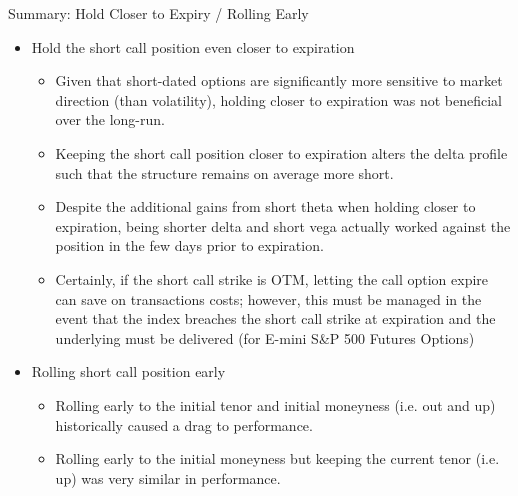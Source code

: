 \documentclass{beamer}
\begin{document}
\begin{frame}{Summary: Hold Closer to Expiry / Rolling Early}
\begin{itemize}
\item Hold the short call position even closer to expiration
\begin{itemize}
\item Given that short-dated options are significantly more sensitive to market direction (than volatility), holding closer to expiration was not beneficial over the long-run.
\item Keeping the short call position closer to expiration alters the delta profile such that the structure remains on average more short. 
\item Despite the additional gains from short theta when holding closer to expiration, being shorter delta and short vega actually worked against the position in the few days prior to expiration. 
\item Certainly, if the short call strike is OTM, letting the call option expire can save on transactions costs; however, this must be managed in the event that the index breaches the short call strike at expiration and the underlying must be delivered (for E-mini S\&P 500 Futures Options)
\end{itemize}
\item Rolling short call position early
\begin{itemize}
\item Rolling early to the initial tenor and initial moneyness (i.e. out and up) historically caused a drag to performance.
\item Rolling early to the initial moneyness but keeping the current tenor (i.e. up) was very similar in performance. 
\end{itemize}
\end{itemize}
\end{frame}
\end{document}
